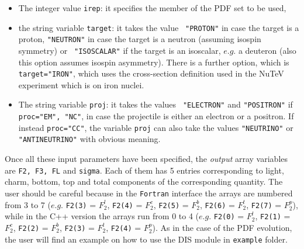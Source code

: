 \documentclass[11pt,a4paper]{article}
\begin{document}
\begin{itemize}
\item The integer value {\tt irep}: it specifies the member of the PDF set to be used,

\item the string variable {\tt target}: it takes the value {\tt
    "PROTON"} in case the target is a proton, {\tt "NEUTRON"} in case
  the target is a neutron (assuming isospin symmetry) or {\tt
    "ISOSCALAR"} if the target is an isoscalar, $e.g.$ a
  deuteron (also this option assumes isospin asymmetry). There is a
  further option, which is {\tt target="IRON"}, which uses the cross-section
  definition used in the NuTeV experiment which is on iron
  nuclei.

\item The string variable {\tt proj}: it takes the values {\tt
    "ELECTRON"} and {\tt "POSITRON"} if {\tt proc="EM", "NC"},
  in case the projectile is either an electron or a positron. If
  instead {\tt proc="CC"}, the variable {\tt proj} can also take the
  values {\tt "NEUTRINO"} or {\tt "ANTINEUTRINO"} with obvious meaning.
\end{itemize}

Once all these input parameters have been specified, the \textit{output}
array variables are {\tt F2, F3, FL} and {\tt sigma}. Each of them has
5 entries corresponding to light, charm, bottom, top and total
components of the corresponding quantity.
%
The user should be careful because in the {\tt Fortran} interface the arrays
are numbered from 3 to 7 ($e.g.$ {\tt F2(3)} = $F_2^l$, {\tt F2(4)} =
$F_2^c$, {\tt F2(5)} = $F_2^b$, {\tt F2(6)} = $F_2^t$, {\tt F2(7)} =
$F_2^p$), while in the C++ version the arrays run from 0 to 4 ($e.g.$ {\tt F2(0)} = $F_2^l$, {\tt F2(1)} =
$F_2^c$, {\tt F2(2)} = $F_2^b$, {\tt F2(3)} = $F_2^t$, {\tt F2(4)} =
$F_2^p$).
%
As in the case of the PDF evolution, the user will find an example on how to use the DIS module in
{\tt example} folder.







\clearpage


\end{document}

